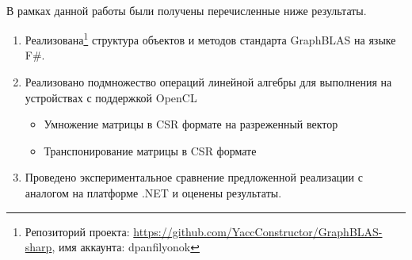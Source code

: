\paragraph{}
В рамках данной работы были получены перечисленные ниже результаты.
\begin{enumerate}
    \item Реализована\footnote{Репозиторий проекта: \url{https://github.com/YaccConstructor/GraphBLAS-sharp}, имя аккаунта: dpanfilyonok} структура объектов и методов стандарта GraphBLAS на языке F\#.
    \item Реализовано подмножество операций линейной алгебры для выполнения на устройствах с поддержкой OpenCL
    \begin{itemize}
      \item Умножение матрицы в CSR формате на разреженный вектор
      \item Транспонирование матрицы в CSR формате
    \end{itemize}
    \item Проведено экспериментальное сравнение предложенной реализации с аналогом на платформе .NET и оценены результаты.
\end{enumerate}
